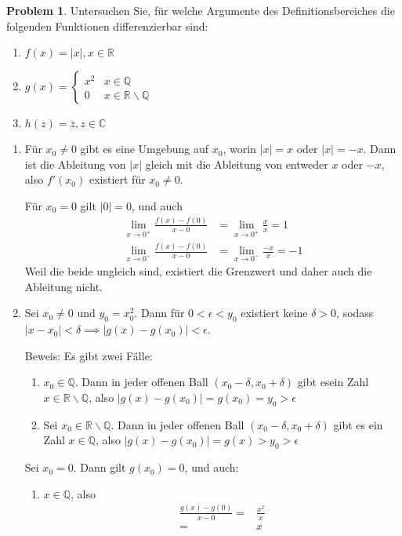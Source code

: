 \documentclass[prb,12pt]{revtex4-2}
\theoremstyle{definition}
\newtheorem{Problem}{Problem}
\theoremstyle{definition}
\newenvironment{parts}{\begin{enumerate}[label=(\alph*)]}{\end{enumerate}}
\newcommand{\R}{\mathbb{R}}
\newcommand{\Q}{\mathbb{Q}}
\newcommand{\C}{\mathbb{C}}
\begin{document}
\begin{Problem}
	Untersuchen Sie, für welche Argumente des Definitionsbereiches die folgenden Funktionen differenzierbar sind:
	\begin{parts}
	\item $f(x)=|x|, x\in \R$ 
	\item $g(x)= \begin{cases}
			x^2 & x\in \Q \\
			0 & x\in \R \backslash \Q
	\end{cases}$ 
\item $h(z)=\overline{z}, z\in \C$
	\end{parts}
\end{Problem}

\begin{parts}
\item F\"{u}r $x_0\neq 0$ gibt es eine Umgebung auf $x_0$, worin $|x|=x$ oder $|x|=-x$. Dann ist die Ableitung von $|x|$ gleich mit die Ableitung von entweder $x$ oder $-x$, also $f'(x_0)$ existiert f\"{u}r $x_0\neq 0$.

	F\"{u}r $x_0=0$ gilt $|0|=0$, und auch
	\begin{align*}
		\lim_{x \to 0^{+}} \frac{f(x)-f(0)}{x-0}&=\lim_{x \to 0^{+}} \frac{x}{x}=1\\
		\lim_{x \to 0^{-}} \frac{f(x)-f(0)}{x-0}&=\lim_{x \to 0^{-}} \frac{-x}{x}=-1
	\end{align*}
	Weil die beide ungleich sind, existiert die Grenzwert und daher auch die Ableitung nicht.

\item Sei $x_0\neq 0$ und $y_0=x_0^2$. Dann f\"{u}r $0<\epsilon<y_0$ existiert keine $\delta>0$, sodass $|x-x_0|<\delta\implies |g(x)-g(x_0)|<\epsilon$.

	Beweis: Es gibt zwei F\"{a}lle:
	\begin{enumerate}[label=(\roman*)]
		\item $x_0\in \Q$. Dann in jeder offenen Ball $(x_0-\delta, x_0+\delta)$ gibt esein Zahl $x \in \R \backslash \Q$, also $|g(x)-g(x_0)|=g(x_0)=y_0>\epsilon$

		\item Sei $x_0\in \R \backslash \Q$. Dann in jeder offenen Ball $(x_0-\delta, x_0+\delta)$ gibt es ein Zahl $x\in \Q$, also $|g(x)-g(x_0)|=g(x)>y_0>\epsilon$
	\end{enumerate}
	Sei $x_0=0$. Dann gilt $g(x_0)=0$, und auch:
	\begin{enumerate}[label=(\roman*)]
		\item $x\in \Q$, also
			\begin{align*}
				\frac{g(x)-g(0)}{x-0}=& \frac{x^2}{x}\\
				=& x
			\end{align*}


\end{enumerate}
\end{parts}
\end{document}
